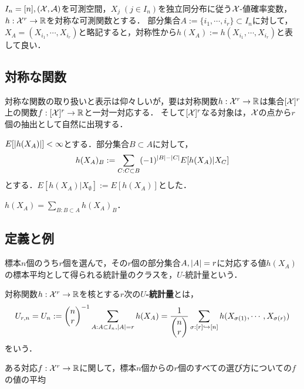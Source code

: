 \documentclass[uplatex,dvipdfmx]{jsreport}
\begin{document}
\begin{notation}
    $I_n=[n],(\mathcal{X},\mathcal{A})$を可測空間，$X_j\;(j\in I_n)$を独立同分布に従う$\mathcal{X}$-値確率変数，$h:\mathcal{X}^r\to\mathbb{R}$を対称な可測関数とする．
    部分集合$A:=\{i_1,\cdots,i_r\}\subset I_n$に対して，$X_A=(X_{i_1},\cdots,X_{i_r})$と略記すると，対称性から$h(X_A):=h(X_{i_1},\cdots,X_{i_r})$と表して良い．
\end{notation}

\subsection{対称な関数}

\begin{tcolorbox}[colframe=ForestGreen, colback=ForestGreen!10!white,breakable,colbacktitle=ForestGreen!40!white,coltitle=black,fonttitle=\bfseries\sffamily,
title=]
    対称な関数の取り扱いと表示は仰々しいが，要は対称関数$h:\mathcal{X}^r\to\mathbb{R}$は集合$[\mathcal{X}]^r$上の関数$f:[\mathcal{X}]^r\to\mathbb{R}$と一対一対応する．
    そして$[\mathcal{X}]^r$なる対象は，$\mathcal{X}$の点から$r$個の抽出として自然に出現する．
\end{tcolorbox}

\begin{definition}
    $E[\lvert h(X_A)\rvert]<\infty$とする．部分集合$B\subset A$に対して，
    \[h(X_A)_B:=\sum_{C:C\subset B}(-1)^{\lvert B\rvert-\lvert C\rvert}E[h(X_A)|X_C]\]
    とする．$E[h(X_A)|X_{\emptyset}]:=E[h(X_A)]$とした．
\end{definition}

\begin{lemma}[反転公式]
    $h(X_A)=\sum_{B:B\subset A}h(X_A)_B$．
\end{lemma}

\subsection{定義と例}

\begin{tcolorbox}[colframe=ForestGreen, colback=ForestGreen!10!white,breakable,colbacktitle=ForestGreen!40!white,coltitle=black,fonttitle=\bfseries\sffamily,
title=]
    標本$n$個のうち$r$個を選んで，その$r$個の部分集合$A,\lvert A\rvert=r$に対応する値$h(X_A)$の標本平均として得られる統計量のクラスを，$U$-統計量という．
\end{tcolorbox}

\begin{definition}[U-statistic]
    対称関数$h:\mathcal{X}^r\to\mathbb{R}$を核とする$r$次の\textbf{$U$-統計量}とは，
    \[U_{r,n}=U_n:=\begin{pmatrix}n\\r\end{pmatrix}^{-1}\sum_{A:A\subset I_n,\lvert A\rvert=r}h(X_A)=\frac{1}{\begin{pmatrix}n\\r\end{pmatrix}}\sum_{\sigma:[r]\hookrightarrow[n]}h(X_{\sigma(1)},\cdots,X_{\sigma(r)})\]
    をいう．
\end{definition}
\begin{remarks}
    ある対応$f:\mathcal{X}^r\to\mathbb{R}$に関して，標本$n$個からの$r$個のすべての選び方についての$f$の値の平均
\end{remarks}
\end{document}
